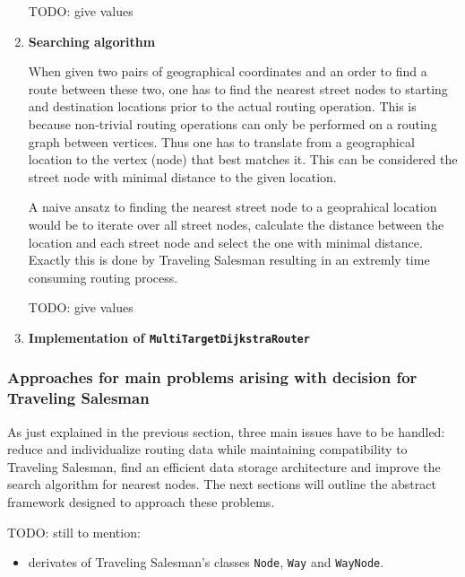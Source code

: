 \begin{enumerate}
		TODO: give values
											
	\item \textbf{Searching algorithm}
	
		When given two pairs of geographical coordinates and an order to find a route between these two, one has to find the nearest street nodes to starting and destination locations prior to the actual routing operation. This is because non-trivial routing operations can only be performed on a routing graph between vertices. Thus one has to translate from a geographical location to the vertex (node) that best matches it. This can be considered the street node with minimal distance to the given location.\newline
				
		A naive ansatz to finding the nearest street node 	to a geoprahical location would be to iterate over all street nodes, calculate the distance between the location and each street node and select the one with minimal distance. Exactly this is done by Traveling Salesman resulting in an extremly time consuming routing process.\newline
		
		TODO: give values

	\item \textbf{Implementation of \texttt{MultiTargetDijkstraRouter}}
	
		

\end{enumerate}


\subsubsection{Approaches for main problems arising with decision for Traveling Salesman}
\label{sec:routing_mobiletsm_approaches}

As just explained in the previous section, three main issues have to be handled: reduce and individualize routing data while maintaining compatibility to Traveling Salesman, find an efficient data storage architecture and improve the search algorithm for nearest nodes. The next sections will outline the abstract framework designed to approach these problems.\newline

TODO: still to mention:
\begin{itemize}
	\item derivates of Traveling Salesman's classes \texttt{Node}, \texttt{Way} and \texttt{WayNode}.
\end{itemize}

